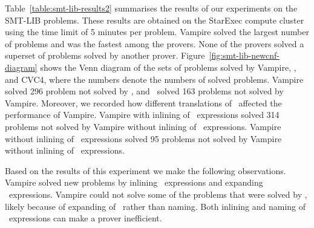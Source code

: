 Table~\ref{table:smt-lib-results2} summarises the results of our experiments on the SMT-LIB problems. These results are obtained on the StarExec compute cluster~\cite{starexec} using the time limit of 5 minutes per problem. Vampire solved the largest number of problems and was the fastest among the provers. None of the provers solved a superset of problems solved by another prover. Figure~\ref{fig:smt-lib-newcnf-diagram} shows the Venn diagram of the sets of problems solved by Vampire, \oldcnfVampire, and CVC4, where the numbers denote the numbers of solved problems. Vampire solved 296 problem not solved by \oldcnfVampire, and \oldcnfVampire\ solved 163 problems not solved by Vampire. Moreover, we recorded how different translations of \LETIN\ affected the performance of Vampire. Vampire with inlining of \LETIN\ expressions solved 314 problems not solved by Vampire without inlining of \LETIN\ expressions. Vampire without inlining of \LETIN\ expressions solved 95 problems not solved by Vampire without inlining of \LETIN\ expressions.

Based on the results of this experiment we make the following observations. Vampire solved new problems by inlining \LETIN\ expressions and expanding \ITE\ expressions. Vampire could not solve some of the problems that were solved by \oldcnfVampire, likely because of expanding of \ITE\ rather than naming. Both inlining and naming of \LETIN\ expressions can make a prover inefficient.










